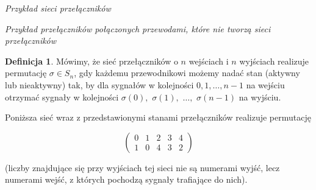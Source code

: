 \documentclass[a4paper]{article}
\theoremstyle{definition}
\newtheorem{df}[tw]{Definicja}
\begin{document}
\begin{minipage}{.5\textwidth}
\begin{center}
\end{center} 
\end{minipage}

\begin{minipage}{.5\textwidth}
    \begin{center}
        {\it Przykład sieci przełączników}
    \end{center}
\end{minipage}
\begin{minipage}{.5\textwidth}
    \begin{center}
        {\it Przykład przełączników połączonych przewodami, które nie tworzą sieci przełączników}
    \end{center}
\end{minipage}




\begin{df}
    Mówimy, że sieć przełączników o \(n\) wejściach i \(n\) wyjściach realizuje permutację \(\sigma \in S_n\), gdy każdemu przewodnikowi możemy nadać stan (aktywny lub nieaktywny) tak, by dla sygnałów w kolejności \(0, 1, \ldots, n-1\) na wejściu otrzymać sygnały w kolejności \(\sigma (0), \,\, \sigma (1), \,\, \ldots, \,\, \sigma (n-1)\) na wyjściu. 
\end{df}

Poniższa sieć wraz z przedstawionymi stanami przełączników realizuje permutację

\[
    \begin{pmatrix}
        0 & 1 & 2 & 3 & 4  \\
        1 & 0 & 4 & 3 & 2 
    \end{pmatrix} 
\]

(liczby znajdujące się przy wyjściach tej sieci nie są numerami wyjść, lecz numerami wejść, z których pochodzą sygnały trafiające do nich).
\end{document}
